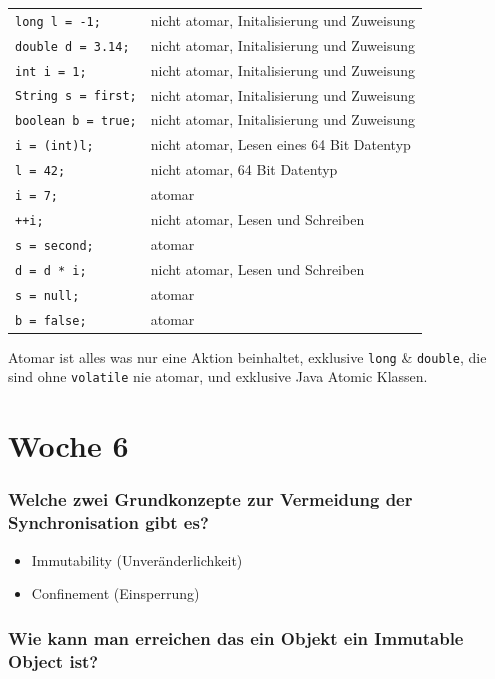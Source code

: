 \documentclass[10pt,a4paper]{scrartcl}
\begin{document}
\begin{tabular}{l l}
	\texttt{long l = -1;} & nicht atomar, Initalisierung und Zuweisung \\
	\texttt{double d = 3.14;} & nicht atomar, Initalisierung und Zuweisung \\
	\texttt{int i = 1;} & nicht atomar, Initalisierung und Zuweisung \\
	\texttt{String s = \dq first\dq;} & nicht atomar, Initalisierung und Zuweisung \\
	\texttt{boolean b = true;} & nicht atomar, Initalisierung und Zuweisung \\
	\texttt{i = (int)l; } & nicht atomar, Lesen eines 64 Bit Datentyp \\
	\texttt{l = 42; } & nicht atomar, 64 Bit Datentyp \\
	\texttt{i = 7;} & atomar \\
	\texttt{++i;} & nicht atomar, Lesen und Schreiben \\
	\texttt{s = \dq second\dq; } & atomar \\
	\texttt{d = d * i;} & nicht atomar, Lesen und Schreiben \\
	\texttt{s = null;} & atomar \\
	\texttt{b = false;} & atomar \\
\end{tabular}

Atomar ist alles was nur eine Aktion beinhaltet, exklusive \texttt{long} \& \texttt{double}, die
sind ohne \texttt{volatile} nie atomar, und exklusive Java Atomic Klassen.


\section{Woche 6}

\subsubsection{Welche zwei Grundkonzepte zur Vermeidung der Synchronisation gibt es?}

\begin{itemize}
	\item Immutability (Unveränderlichkeit)
	\item Confinement (Einsperrung)
\end{itemize}
  
\subsubsection{Wie kann man erreichen das ein Objekt ein Immutable Object ist?}
\end{document}

